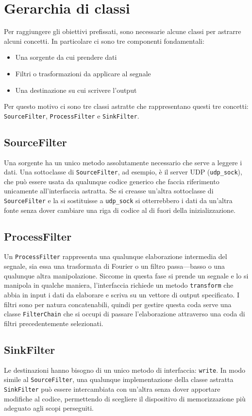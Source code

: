 \section{Gerarchia di classi}
Per raggiungere gli obiettivi prefissati, sono necessarie alcune classi per
astrarre alcuni concetti. In particolare ci sono tre componenti fondamentali:
\begin{itemize}
\item Una sorgente da cui prendere dati
\item Filtri o trasformazioni da applicare al segnale
\item Una destinazione su cui scrivere l'output
\end{itemize}
Per questo motivo ci sono tre classi astratte che rappresentano questi tre
concetti: \\
\texttt{SourceFilter}, \texttt{ProcessFilter} e \texttt{SinkFilter}.
\subsection{SourceFilter}
Una sorgente ha un unico metodo assolutamente necessario che serve a leggere i
dati. Una sottoclasse di \texttt{SourceFilter}, ad esempio, \`e il server UDP
(\texttt{udp\_sock}), che pu\`o essere usata da qualunque codice generico che
faccia riferimento unicamente all'interfaccia astratta. Se si creasse un'altra
sottoclasse di \texttt{SourceFilter} e la si sostituisse a \texttt{udp\_sock} si
otterrebbero i dati da un'altra fonte senza dover cambiare una riga di codice al
di fuori della inizializzazione.
\subsection{ProcessFilter}
Un \texttt{ProcessFilter} rappresenta una qualunque elaborazione intermedia del
segnale, sia essa una trasformata di Fourier o un filtro passa---basso o una
qualunque altra manipolazione. Siccome in questa fase si prende un segnale e lo
si manipola in qualche maniera, l'interfaccia richiede un metodo
\texttt{transform} che abbia in input i dati da elaborare e scriva su un vettore
di output specificato. I filtri sono per natura concatenabili, quindi per
gestire questa coda serve una classe \texttt{FilterChain} che si occupi di
passare l'elaborazione attraverso una coda di filtri precedentemente
selezionati.
\subsection{SinkFilter}
Le destinazioni hanno bisogno di un unico metodo di interfaccia: \texttt{write}.
In modo simile al \texttt{SourceFilter}, una qualunque implementazione della
classe astratta \texttt{SinkFilter} pu\`o essere intercambiata con un'altra
senza dover apportare modifiche al codice, permettendo di scegliere il
dispositivo di memorizzazione pi\`u adeguato agli scopi perseguiti.
